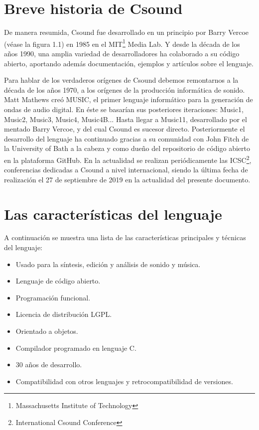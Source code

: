 \section{Breve historia de Csound}\label{sec:intro}

De manera resumida, Csound fue desarrollado en un principio por Barry Vercoe (véase la figura 1.1) en 1985 en el MIT\footnote{Massachusetts Institute of Technology} Media Lab. Y desde la década de los años 1990, una amplia variedad de desarrolladores ha colaborado a su código abierto, aportando además documentación, ejemplos y artículos sobre el lenguaje.


Para hablar de los verdaderos orígenes de Csound debemos remontarnos a la década de los años 1970, a los orígenes de la producción informática de sonido. 
Matt Mathews creó MUSIC, el primer lenguaje informático para la generación de ondas de audio digital. En éste se basarían sus posteriores iteraciones: Music1, Music2, Music3, Music4, Music4B... Hasta llegar a Music11, desarrollado por el mentado Barry Vercoe, y del cual Csound es sucesor directo.
Posteriormente el desarrollo del lenguaje ha continuado gracias a su comunidad con John Fitch de la University of Bath a la cabeza y como dueño del repositorio de código abierto en la plataforma GitHub.
En la actualidad se realizan periódicamente las ICSC\footnote{International Csound Conference}, conferencias dedicadas a Csound a nivel internacional, siendo la última fecha de realización el 27 de septiembre de 2019 en la actualidad del presente documento.

\section{Las características del lenguaje}\label{sec:intro}

A continuación se muestra una lista de las características principales y técnicas del lenguaje:
\begin{itemize}
 \item Usado para la síntesis, edición y análisis de sonido y música.
 \item Lenguaje de código abierto.
 \item Programación funcional.
 \item Licencia de distribución LGPL.
 \item Orientado a objetos.
 \item Compilador programado en lenguaje C.
 \item 30 años de desarrollo.
 \item Compatibilidad con otros lenguajes y retrocompatibilidad de versiones.
\end{itemize}



